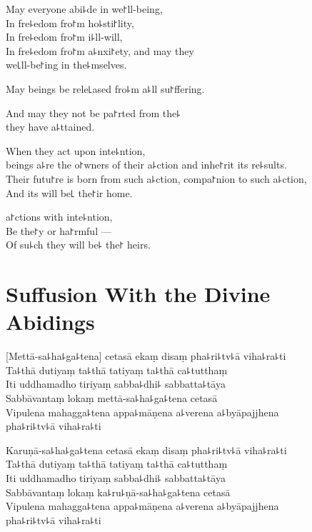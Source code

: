 May everyone abi꜕de in we꜓ll-being,\\
In fre꜕edom fro꜓m ho꜕sti꜓lity,\\
In fre꜕edom fro꜓m i꜕ll-will,\\
In fre꜕edom fro꜓m a꜕nxi꜓ety, and may they\\
 we꜖ll-be꜓ing in the꜕mselves.

May  beings be rele꜖ased fro꜕m a꜕ll su꜓ffering.

And may they not be pa꜓rted from the꜕\\
\vin {} they have a꜕ttained.

When they act upon inte꜕ntion,\\
 beings a꜕re the o꜓wners of their a꜕ction and inhe꜓rit its re꜕sults.\\
Their futu꜓re is born from such a꜕ction, compa꜓nion to such a꜕ction,\\
And its  will be꜖ the꜓ir home.

 a꜓ctions with inte꜕ntion,\\
Be the꜓y  or ha꜓rmful ---\\
Of su꜕ch  they will be꜕ the꜓ heirs.

\chapter*[Divine Abidings]{Suffusion With the Divine Abidings}%

\delegateSetUseNext


\begin{leader}
\end{leader}


[Mettā-sa꜕ha꜕ga꜕tena] cetasā ekaṃ disaṃ pha꜕ri꜕tv꜕ā viha꜕ra꜕ti\\
Ta꜕thā dutiyaṃ ta꜕thā tatiyaṃ ta꜕thā ca꜕tutthaṃ\\
Iti uddhamadho tiriyaṃ sabba꜕dhi꜕ sabbatta꜕tāya\\
Sabbāvantaṃ lokaṃ mettā-sa꜕ha꜕ga꜕tena cetasā\\
Vipulena mahagga꜕tena appa꜕māṇena a꜕verena a꜕byāpajjhena\\
\vin pha꜕ri꜕tv꜕ā viha꜕ra꜕ti

Karuṇā-sa꜕ha꜕ga꜕tena cetasā ekaṃ disaṃ pha꜕ri꜕tv꜕ā viha꜕ra꜕ti\\
Ta꜕thā dutiyaṃ ta꜕thā tatiyaṃ ta꜕thā ca꜕tutthaṃ\\
Iti uddhamadho tiriyaṃ sabba꜕dhi꜕ sabbatta꜕tāya\\
Sabbāvantaṃ lokaṃ ka꜕ru꜕ṇā-sa꜕ha꜕ga꜕tena cetasā\\
Vipulena mahagga꜕tena appa꜕māṇena a꜕verena a꜕byāpajjhena\\
\vin pha꜕ri꜕tv꜕ā viha꜕ra꜕ti

